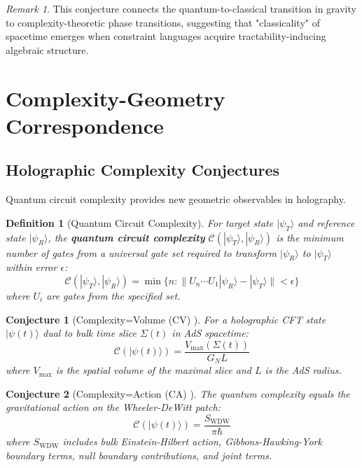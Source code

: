 \documentclass[11pt,a4paper]{article}
\newtheorem{definition}{Definition}[section]
\newtheorem{conjecture}{Conjecture}[section]
\theoremstyle{remark}
\newtheorem{remark}{Remark}[section]
\theoremstyle{definition}
\begin{document}
\begin{remark}
This conjecture connects the quantum-to-classical transition in gravity to complexity-theoretic phase transitions, suggesting that "classicality" of spacetime emerges when constraint languages acquire tractability-inducing algebraic structure.
\end{remark}

\section{Complexity-Geometry Correspondence}
\label{sec:complexity_correspondence}

\subsection{Holographic Complexity Conjectures}

Quantum circuit complexity provides new geometric observables in holography.

\begin{definition}[Quantum Circuit Complexity]
For target state $|\psi_T\rangle$ and reference state $|\psi_R\rangle$, the \textbf{quantum circuit complexity} $\mathcal{C}(|\psi_T\rangle, |\psi_R\rangle)$ is the minimum number of gates from a universal gate set required to transform $|\psi_R\rangle$ to $|\psi_T\rangle$ within error $\epsilon$:
\begin{equation}
\mathcal{C}(|\psi_T\rangle, |\psi_R\rangle) = \min\{n : \|U_n \cdots U_1 |\psi_R\rangle - |\psi_T\rangle\| < \epsilon\}
\end{equation}
where $U_i$ are gates from the specified set.
\end{definition}

\begin{conjecture}[Complexity=Volume (CV) \cite{Susskind2014}]
For a holographic CFT state $|\psi(t)\rangle$ dual to bulk time slice $\Sigma(t)$ in AdS spacetime:
\begin{equation}
\mathcal{C}(|\psi(t)\rangle) = \frac{V_{\max}(\Sigma(t))}{G_N L}
\end{equation}
where $V_{\max}$ is the spatial volume of the maximal slice and $L$ is the AdS radius.
\end{conjecture}

\begin{conjecture}[Complexity=Action (CA) \cite{Brown2016}]
The quantum complexity equals the gravitational action on the Wheeler-DeWitt patch:
\begin{equation}
\mathcal{C}(|\psi(t)\rangle) = \frac{S_{\text{WDW}}}{\pi \hbar}
\end{equation}
where $S_{\text{WDW}}$ includes bulk Einstein-Hilbert action, Gibbons-Hawking-York boundary terms, null boundary contributions, and joint terms.
\end{conjecture}
\end{document}
